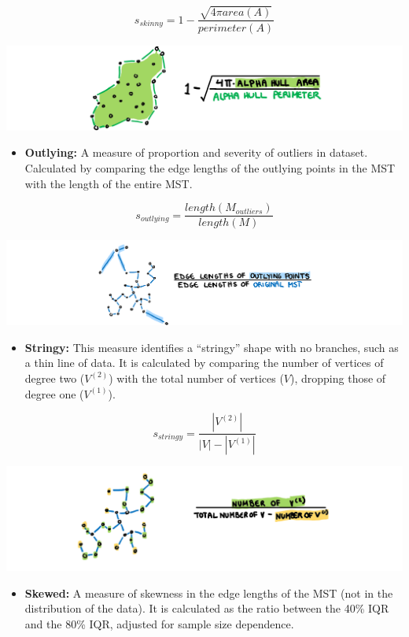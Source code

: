 \[s_{skinny}= 1-\frac{\sqrt{4\pi area(A)}}{perimeter(A)}\]

\includegraphics{figures/drawskinny.png}

\begin{itemize}
\tightlist
\item
  \textbf{Outlying:} A measure of proportion and severity of outliers in
  dataset. Calculated by comparing the edge lengths of the outlying
  points in the MST with the length of the entire MST.
\end{itemize}

\[s_{outlying}=\frac{length(M_{outliers})}{length(M)}\]

\includegraphics{figures/drawoutlying.png}

\begin{itemize}
\tightlist
\item
  \textbf{Stringy:} This measure identifies a ``stringy'' shape with no
  branches, such as a thin line of data. It is calculated by comparing
  the number of vertices of degree two (\(V^{(2)}\)) with the total
  number of vertices (\(V\)), dropping those of degree one
  (\(V^{(1)}\)).
\end{itemize}

\[s_{stringy} = \frac{|V^{(2)}|}{|V|-|V^{(1)}|}\]

\includegraphics{figures/drawstringy.png}

\begin{itemize}
\tightlist
\item
  \textbf{Skewed:} A measure of skewness in the edge lengths of the MST
  (not in the distribution of the data). It is calculated as the ratio
  between the 40\% IQR and the 80\% IQR, adjusted for sample size
  dependence.
\end{itemize}

